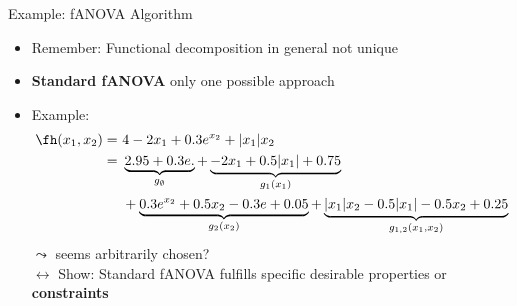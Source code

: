 \documentclass[10pt,compress,t,notes=noshow, xcolor=table]{beamer}
\begin{document}
\begin{frame}{Example: fANOVA Algorithm}
    \begin{itemize}
        \item Remember: Functional decomposition in general not unique
        \item \textbf{Standard fANOVA} only one possible approach
        \item Example:
        \begin{align*}
            \fh(x_1, x_2) =\,&\,4 - 2x_1 + 0.3 e^{x_2} + |x_1|x_2 \\
            =\,&\,\underbrace{2.95 + 0.3 e.}_{g_\emptyset} + \underbrace{-2x_1 + 0.5|x_1| + 0.75}_{g_1(x_1)} \\
            \,&\,+ \underbrace{0.3 e^{x_2} + 0.5x_2 - 0.3e + 0.05}_{g_2(x_2)} + \underbrace{|x_1| x_2 - 0.5 |x_1| - 0.5 x_2 + 0.25}_{g_{1,2}(x_1, x_2)}
        \end{align*}
        $\leadsto$ seems arbitrarily chosen? \\
        $\longleftrightarrow$ Show: Standard fANOVA fulfills specific desirable properties or \textbf{constraints}
    \end{itemize}




    
\end{frame}
\end{document}
